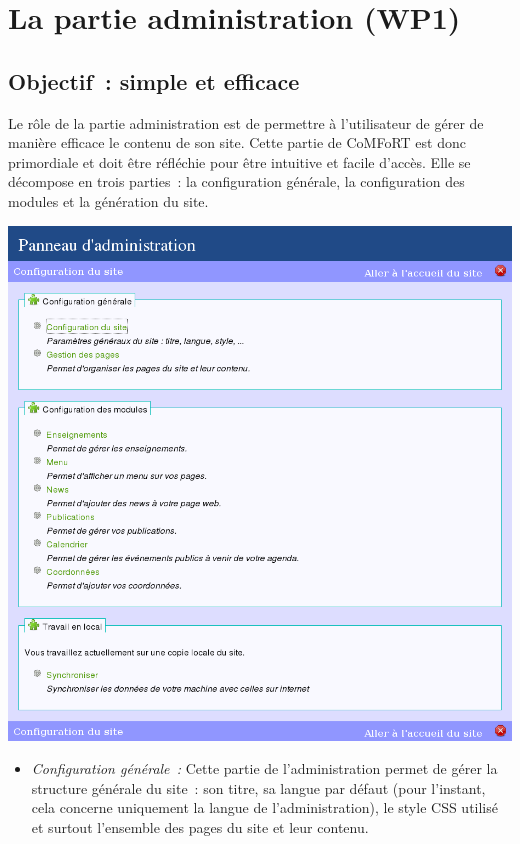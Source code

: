 \documentclass[final,11pt,a4paper,twoside,titlepage]{article}
\begin{document}
{  \section{La partie administration (WP1)}
    \subsection{Objectif~: simple et efficace}
      Le rôle de la partie administration est de permettre à
      l'utilisateur de gérer de manière efficace le contenu de son site. Cette
      partie de CoMFoRT est donc primordiale et doit être réfléchie pour être
      intuitive et facile d'accès. Elle se décompose en trois parties~: la 
      configuration générale, la configuration des modules et la génération du 
      site.
      
      \vspace{1em}
      \begin{center}
      \includegraphics[width=16cm]{admin_general.png}
      \end{center}
      \vspace{1em}
      
      \begin{itemize}
      \item \emph{Configuration générale~:}
        Cette partie de l'administration permet de gérer la structure générale 
        du site~: son titre, sa langue par défaut (pour l'instant, cela concerne
        uniquement la langue de l'administration), le style CSS utilisé et 
        surtout l'ensemble des pages du site et leur contenu.
      

\end{itemize}}
\end{document}
